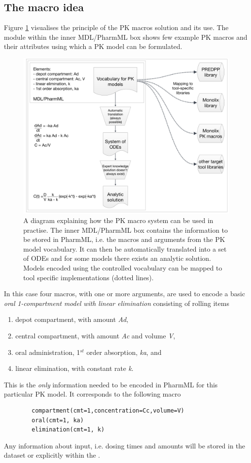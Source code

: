 \subsection{The macro idea}
Figure \ref{fig:flowDiagram} visualises the principle of the PK macros solution and its use. The module 
within the inner MDL/PharmML box shows few example PK macros and their attributes using which a 
PK model can be formulated. 
\begin{figure}[htb!]
\centering
  \includegraphics[width=160mm]{pics/PKmacrosPrinciple.pdf}
 \caption{A diagram explaining how the PK macro system can be used in practise. The inner 
 MDL/PharmML box contains the information to be stored in PharmML, i.e. the macros and arguments 
 from the PK model vocabulary. It can then be automatically translated into a set of ODEs and for some 
 models there exists an analytic solution. Models encoded using the controlled vocabulary can be 
 mapped to tool specific implementations (dotted lines).}
 \label{fig:flowDiagram}
\end{figure}
In this case four macros, with one or more arguments, are used to encode a basic \emph{oral 1-compartment 
model with linear elimination} consisting of rolling items
\begin{enumerate}
\item
depot compartment, with amount \emph{Ad},
\item
central compartment, with amount \emph{Ac} and volume \emph{V},
\item
oral administration, 1$^{st}$ order absorption, \emph{ka}, and 
\item
linear elimination, with constant rate \emph{k}.
\end{enumerate}
This is the \emph{only} information needed to be encoded in PharmML for this particular PK model. It 
corresponds to the following macro
\lstset{language=NONMEMdataSet}
\begin{lstlisting}
		compartment(cmt=1,concentration=Cc,volume=V) 
		oral(cmt=1, ka) 
		elimination(cmt=1, k)
\end{lstlisting}
Any information about input, i.e. dosing times and amounts will be stored in the dataset 
or explicitly within the .

